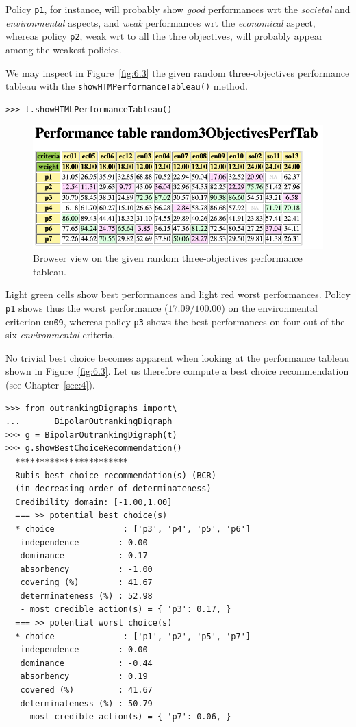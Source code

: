 Policy \texttt{p1}, for instance, will probably show \emph{good} performances wrt the \emph{societal} and \emph{environmental} aspects, and \emph{weak} performances wrt the \emph{economical} aspect, whereas policy \texttt{p2}, weak wrt to all the thre objectives, will probably appear among the weakest policies.

We may inspect in Figure~\vref{fig:6.3} the given random three-objectives performance tableau with the \texttt{showHTMPerformanceTableau()} method.
\begin{lstlisting}
>>> t.showHTMLPerformanceTableau()
\end{lstlisting}
\begin{figure}[ht]
\includegraphics[width=\hsize]{Figures/6-3-random3ObjPerfTab.png}
\caption{Browser view on the given random three-objectives performance tableau.}
\label{fig:6.3}       %
\end{figure}

Light green cells show best performances and light red worst performances. Policy \texttt{p1} shows thus the worst performance ($17.09/100.00$) on the environmental criterion \texttt{en09}, whereas policy \texttt{p3} shows the best performances on four out of the six \emph{environmental} criteria.

No trivial best choice becomes apparent when looking at the performance tableau shown in Figure~\vref{fig:6.3}. Let us therefore compute a \Rubis best choice recommendation (see Chapter~\vref{sec:4}).
\begin{lstlisting}[caption={What is the public policy to recommend as best choice ?},label=list:6.4]
>>> from outrankingDigraphs import\
...       BipolarOutrankingDigraph
>>> g = BipolarOutrankingDigraph(t)
>>> g.showBestChoiceRecommendation()
  ***********************
  Rubis best choice recommendation(s) (BCR)
  (in decreasing order of determinateness)   
  Credibility domain: [-1.00,1.00]
  === >> potential best choice(s)
  * choice              : ['p3', 'p4', 'p5', 'p6']
   independence        : 0.00
   dominance           : 0.17
   absorbency          : -1.00
   covering (%)        : 41.67
   determinateness (%) : 52.98
   - most credible action(s) = { 'p3': 0.17, }
  === >> potential worst choice(s) 
  * choice              : ['p1', 'p2', 'p5', 'p7']
   independence        : 0.00
   dominance           : -0.44
   absorbency          : 0.19
   covered (%)         : 41.67
   determinateness (%) : 50.79
   - most credible action(s) = { 'p7': 0.06, }
\end{lstlisting}

